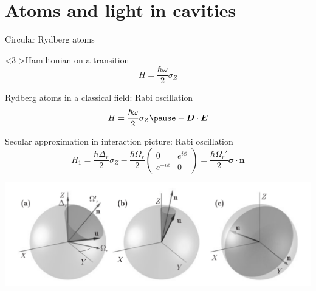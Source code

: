 \documentclass{beamer}
\newcommand{\ket}[1]{|#1\rangle}
\newcommand{\mat}[1]{\begin{pmatrix}#1\end{pmatrix}}
\newcommand{\bs}{\boldsymbol}
\begin{document}
\section{Atoms and light in cavities}

\begin{frame}{Circular Rydberg atoms}
\begin{center}
\end{center}

\vfill

  \begin{block}<3->{Hamiltonian on a transition}
    \[H = \frac{\hbar \omega}2 \sigma_Z\]
  \end{block}

\end{frame}

\begin{frame}{Rydberg atoms in a classical field: Rabi oscillation}
  \[H = \frac{\hbar \omega}2 \sigma_Z \pause - \bs D \cdot \bs E\]

  \pause{}

  \begin{block}{Secular approximation in interaction picture: Rabi oscillation}
    \[H_1 = \frac{\hbar \Delta_r}2 \sigma_Z - \frac{\hbar \Omega_r}2
      \mat{0&e^{i\phi}\\e^{-i\phi}&0} = \frac{\hbar \Omega_r'}2 \bs \sigma
      \cdot \bs n\]
  \end{block}

  \pause{}

  \includegraphics[width=\textwidth]{Rabi.png}
\end{frame}
\end{document}
